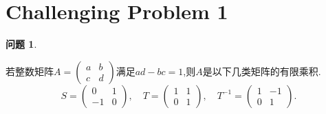 \documentclass[11pt]{ctexart}
\theoremstyle{definition}
\newtheorem{qqq}{问题}[section]
\numberwithin{equation}{section}
\begin{document}
\section{Challenging Problem 1}
\begin{qqq} 
    \begin{pinked}
    若整数矩阵$A=
    \begin{pmatrix}
        a&b\\c&d
    \end{pmatrix}$满足$ad-bc=1$,则$A$是以下几类矩阵的有限乘积.$$
    S=\begin{pmatrix}
        0 &1\\-1&0
    \end{pmatrix},\quad
    T=\begin{pmatrix}
        1&1\\0&1
    \end{pmatrix},\quad
    T^{-1}=\begin{pmatrix}
        1&-1\\0&1
    \end{pmatrix}.
    $$
    \end{pinked}   
\end{qqq}
\end{document}
